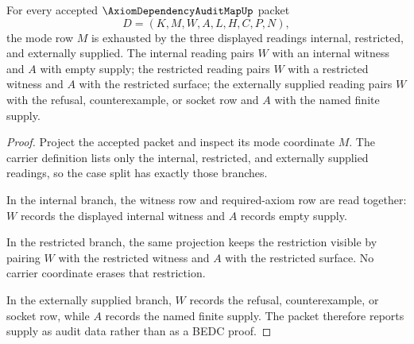 \begin{theorem}
\label{thm:axiom-dependency-audit-map-mode-totality}
For every accepted $\AxiomDependencyAuditMapUp$ packet
$$
D=(K,M,W,A,L,H,C,P,N),
$$
the mode row $M$ is exhausted by the three displayed readings internal, restricted, and externally supplied. The internal reading pairs $W$ with an internal witness and $A$ with empty supply; the restricted reading pairs $W$ with a restricted witness and $A$ with the restricted surface; the externally supplied reading pairs $W$ with the refusal, counterexample, or socket row and $A$ with the named finite supply.
\end{theorem}
\begin{proof}
Project the accepted packet and inspect its mode coordinate $M$. The carrier definition lists only the internal, restricted, and externally supplied readings, so the case split has exactly those branches.

In the internal branch, the witness row and required-axiom row are read together: $W$ records the displayed internal witness and $A$ records empty supply.

In the restricted branch, the same projection keeps the restriction visible by pairing $W$ with the restricted witness and $A$ with the restricted surface. No carrier coordinate erases that restriction.

In the externally supplied branch, $W$ records the refusal, counterexample, or socket row, while $A$ records the named finite supply. The packet therefore reports supply as audit data rather than as a BEDC proof.
\end{proof}

